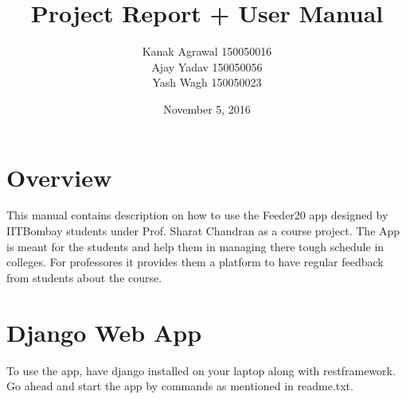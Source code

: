 \documentclass[12pt]{extreport}
\title{Project Report + User Manual}
\author{Kanak Agrawal 150050016 \\ Ajay Yadav 150050056 \\ Yash Wagh  150050023}
\date{November 5, 2016}
\begin{document}
\maketitle
  \chapter*{Overview}
This manual contains description on how to use the Feeder20 app designed by IITBombay students under Prof. Sharat Chandran as a course project. The App is meant for the students and help them in managing there tough schedule in colleges. For professores it provides them a platform to have regular feedback from students about the course.

  \chapter*{Django Web App}
  To use the app, have django installed on your laptop along with restframework. Go ahead and start the app by commands as mentioned in readme.txt. 
  
\end{document}
